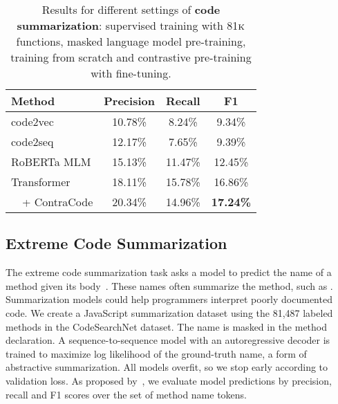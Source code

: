 \documentclass[11pt]{article}
\newcommand{\thou}[0]{$\textsc{k}$}
\newcommand{\ours}[0]{ContraCode}
\begin{document}
\begin{table}
\centering
\setlength\tabcolsep{4.2pt}
\centering
\begin{tabular}{lccc} \hline
    \textbf{Method} & \textbf{Precision} & \textbf{Recall} & \textbf{F1} \\
    \hline
    code2vec & 10.78\% & 8.24\% & 9.34\% \\
    code2seq & 12.17\% & 7.65\% & 9.39\% \\
    RoBERTa MLM & 15.13\% & 11.47\% & 12.45\% \\
    Transformer & 18.11\% & 15.78\% & 16.86\% \\
    \rowcolor{Gray}
    ~~+ \ours{} & 20.34\% & 14.96\% & \textbf{17.24\%}  \\  \hline
\end{tabular}
\caption{Results for different settings of \textbf{code summarization}: supervised training with 81\thou{} functions, masked language model pre-training, training from scratch and contrastive pre-training with fine-tuning.}
\label{tab:summarization}
\end{table} 
\subsection{Extreme Code Summarization}
\label{sec:experiments_code_summarization}
The extreme code summarization task asks a model to predict the name of a method given its body~\citep{allamanis2016convolutional}. These names often summarize the method, such as . Summarization models could help programmers interpret poorly documented code. We create a JavaScript summarization dataset using the 81,487 labeled methods in the CodeSearchNet dataset. The name is masked in the method declaration. A sequence-to-sequence model with an autoregressive decoder is trained to maximize log likelihood of the ground-truth name, a form of abstractive summarization. All models overfit, so we stop early according to validation loss. As proposed by~\citet{allamanis2016convolutional}, we evaluate model predictions by precision, recall and F1 scores over the set of method name tokens.
\end{document}

